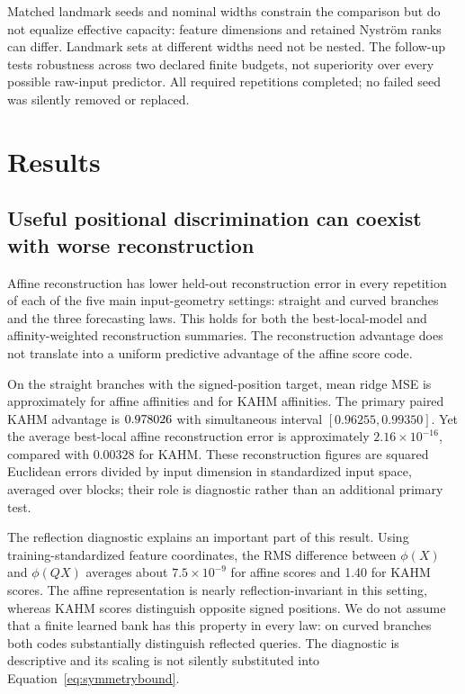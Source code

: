 \documentclass[10pt]{article}
\begin{document}
Matched landmark seeds and nominal widths constrain the comparison but
do not equalize effective capacity: feature dimensions and retained
Nystr\"om ranks can differ. Landmark sets at different widths need not be
nested. The follow-up tests robustness across two declared finite budgets,
not superiority over every possible raw-input predictor. All required
repetitions completed; no failed seed was silently removed or replaced.

\section{Results}\label{sec:results}

\subsection{Useful positional discrimination can coexist with worse reconstruction}
\label{sec:branchresults}

Affine reconstruction has lower held-out reconstruction error in every
repetition of each of the five main input-geometry settings: straight and
curved branches and the three forecasting laws. This holds for both the
best-local-model and affinity-weighted reconstruction summaries. The
reconstruction advantage does not translate into a uniform predictive
advantage of the affine score code.

On the straight branches with the signed-position target, mean ridge MSE
is approximately \FlatWithinAffineMSE{} for affine affinities and
\FlatWithinKAHMMSE{} for KAHM
affinities. The primary paired KAHM advantage is
$0.978026$ with simultaneous interval $[0.96255,0.99350]$. Yet the average
best-local affine reconstruction error is approximately
$2.16\times10^{-16}$, compared with $0.00328$ for KAHM. These reconstruction
figures are squared Euclidean errors divided by input dimension in
standardized input space, averaged over blocks; their role is diagnostic
rather than an additional primary test.

The reflection diagnostic explains an important part of this result.
Using training-standardized feature coordinates, the RMS difference
between $\phi(X)$ and $\phi(QX)$ averages about $7.5\times10^{-9}$ for
affine scores and 1.40 for KAHM scores. The affine representation is nearly
reflection-invariant in this setting, whereas KAHM scores distinguish
opposite signed positions. We do not assume that a finite learned bank
has this property in every law: on curved branches both codes substantially
distinguish reflected queries. The diagnostic is descriptive and its
scaling is not silently substituted into Equation~\eqref{eq:symmetrybound}.
\end{document}
